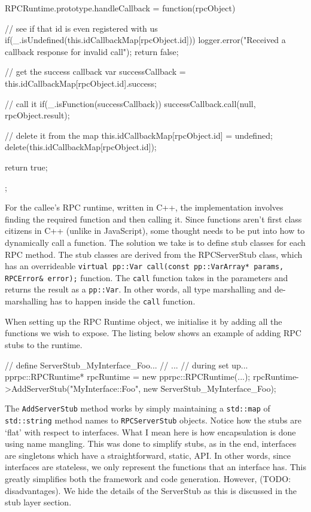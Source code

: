 \begin{code}
  RPCRuntime.prototype.handleCallback = function(rpcObject){
    // see if that id is even registered with us
    if(_.isUndefined(this.idCallbackMap[rpcObject.id])){
      logger.error("Received a callback response for invalid call");
      return false;
    }

    // get the success callback
    var successCallback = this.idCallbackMap[rpcObject.id].success;

    // call it
    if(_.isFunction(successCallback)){
      successCallback.call(null, rpcObject.result);
    }

    // delete it from the map
    this.idCallbackMap[rpcObject.id] = undefined;
    delete(this.idCallbackMap[rpcObject.id]);

    return true;
  };
\end{code}

\vspace{10 mm}

For the callee's RPC runtime, written in C++, the implementation involves finding the required function and then calling it. Since functions aren't first class citizens in C++ (unlike in JavaScript), some thought needs to be put into how to dynamically call a function. The solution we take is to define stub classes for each RPC method. The stub classes are derived from the RPCServerStub class, which has an overrideable \lstinline{virtual pp::Var call(const pp::VarArray* params, RPCError& error);} function. The \lstinline{call} function takes in the parameters and returns the result as a \lstinline{pp::Var}. In other words, all type marshalling and de-marshalling has to happen inside the \lstinline{call} function. 

When setting up the RPC Runtime object, we initialise it by adding all the functions we wish to expose. The listing below shows an example of adding RPC stubs to the runtime.

\begin{code}
// define ServerStub_MyInterface_Foo...
// ... 
// during set up...
pprpc::RPCRuntime* rpcRuntime = new pprpc::RPCRuntime(...);
rpcRuntime->AddServerStub("MyInterface::Foo", new ServerStub_MyInterface_Foo);

\end{code}

The \lstinline{AddServerStub} method works by simply maintaining a \lstinline{std::map} of \lstinline{std::string} method names to \lstinline{RPCServerStub} objects. Notice how the stubs are `flat' with respect to interfaces. What I mean here is how encapsulation is done using name mangling. This was done to simplify stubs, as in the end, interfaces are singletons which have a straightforward, static, API. In other words, since interfaces are stateless, we only represent the functions that an interface has. This greatly simplifies both the framework and code generation. However, (TODO: disadvantages). We hide the details of the ServerStub as this is discussed in the stub layer section.

